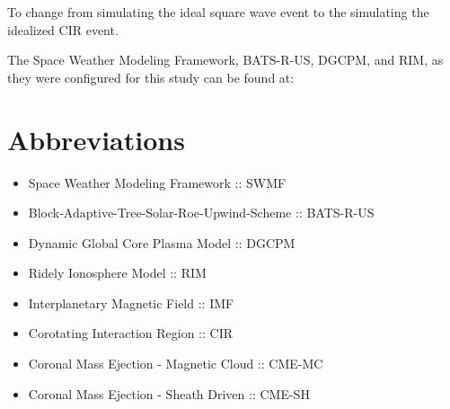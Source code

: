 \documentclass[utf8]{frontiersinFPHY_FAMS}
\begin{document}
To change from simulating the ideal square wave event to the simulating the idealized CIR event.

The Space Weather Modeling Framework, BATS-R-US, DGCPM, and RIM, as they were configured for this study can be found at:



\section{Abbreviations}
\begin{itemize}
	\item Space Weather Modeling Framework :: SWMF
	\item Block-Adaptive-Tree-Solar-Roe-Upwind-Scheme :: BATS-R-US
	\item Dynamic Global Core Plasma Model :: DGCPM
	\item Ridely Ionosphere Model :: RIM
	\item Interplanetary Magnetic Field :: IMF
	\item Corotating Interaction Region :: CIR
	\item Coronal Mass Ejection - Magnetic Cloud :: CME-MC
	\item Coronal Mass Ejection - Sheath Driven :: CME-SH
\end{itemize}



\end{document}

